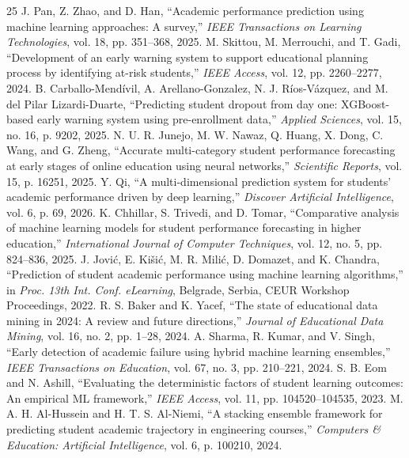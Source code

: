 \documentclass[conference]{IEEEtran}
\begin{document}
\begin{thebibliography}{25}
 J. Pan, Z. Zhao, and D. Han, ``Academic performance prediction using machine learning approaches: A survey,'' \textit{IEEE Transactions on Learning Technologies}, vol. 18, pp. 351--368, 2025.
 M. Skittou, M. Merrouchi, and T. Gadi, ``Development of an early warning system to support educational planning process by identifying at-risk students,'' \textit{IEEE Access}, vol. 12, pp. 2260--2277, 2024.
 B. Carballo-Mend\'ivil, A. Arellano-Gonzalez, N. J. R\'ios-V\'azquez, and M. del Pilar Lizardi-Duarte, ``Predicting student dropout from day one: XGBoost-based early warning system using pre-enrollment data,'' \textit{Applied Sciences}, vol. 15, no. 16, p. 9202, 2025.
 N. U. R. Junejo, M. W. Nawaz, Q. Huang, X. Dong, C. Wang, and G. Zheng, ``Accurate multi-category student performance forecasting at early stages of online education using neural networks,'' \textit{Scientific Reports}, vol. 15, p. 16251, 2025.
 Y. Qi, ``A multi-dimensional prediction system for students' academic performance driven by deep learning,'' \textit{Discover Artificial Intelligence}, vol. 6, p. 69, 2026.
 K. Chhillar, S. Trivedi, and D. Tomar, ``Comparative analysis of machine learning models for student performance forecasting in higher education,'' \textit{International Journal of Computer Techniques}, vol. 12, no. 5, pp. 824--836, 2025.
 J. Jovi\'c, E. Ki\v{s}i\'c, M. R. Mili\'c, D. Domazet, and K. Chandra, ``Prediction of student academic performance using machine learning algorithms,'' in \textit{Proc. 13th Int. Conf. eLearning}, Belgrade, Serbia, CEUR Workshop Proceedings, 2022.
 R. S. Baker and K. Yacef, ``The state of educational data mining in 2024: A review and future directions,'' \textit{Journal of Educational Data Mining}, vol. 16, no. 2, pp. 1--28, 2024.
 A. Sharma, R. Kumar, and V. Singh, ``Early detection of academic failure using hybrid machine learning ensembles,'' \textit{IEEE Transactions on Education}, vol. 67, no. 3, pp. 210--221, 2024.
 S. B. Eom and N. Ashill, ``Evaluating the deterministic factors of student learning outcomes: An empirical ML framework,'' \textit{IEEE Access}, vol. 11, pp. 104520--104535, 2023.
 M. A. H. Al-Hussein and H. T. S. Al-Niemi, ``A stacking ensemble framework for predicting student academic trajectory in engineering courses,'' \textit{Computers \& Education: Artificial Intelligence}, vol. 6, p. 100210, 2024.

\end{thebibliography}
\end{document}
